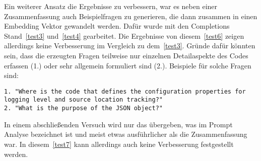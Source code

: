 \documentclass[../main.tex]{subfiles}
\begin{document}
Ein weiterer Ansatz die Ergebnisse zu verbessern, war es neben einer Zusammenfassung auch Beispielfragen zu generieren, die dann zusammen in einen Embedding Vektor gewandelt werden.
Dafür wurde mit den Completions Stand~\ref{test3} und~\ref{test4} gearbeitet.
Die Ergebnisse von diesem~\ref{test6} zeigen allerdings keine Verbesserung im Vergleich zu dem~\ref{test3}.
Gründe dafür könnten sein, dass die erzeugten Fragen teilweise nur einzelnen Detailaspekte des Codes erfassen (1.) oder sehr allgemein formuliert sind (2.).
Beispiele für solche Fragen sind:
\begin{center}
\begin{lstlisting}
1. "Where is the code that defines the configuration properties for logging level and source location tracking?"
2. "What is the purpose of the JSON object?"
\end{lstlisting}
\end{center}

In einem abschließenden Versuch wird nur das übergeben, was im Prompt Analyse bezeichnet ist und meist etwas ausführlicher als die Zusammenfassung war. 
In diesem~\ref{test7} kann allerdings auch keine Verbesserung festgestellt werden.
\end{document}
